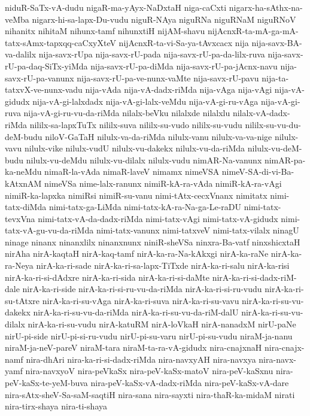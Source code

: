 {niduR-SaTx-vA-dudu
nigaR-ma-yAyx-NaDxtaH
niga-caCxti
nigarx-ha-sAthx-na-veMba
nigarx-hi-sa-lapx-Du-vudu
niguR-NAya
niguRNa
niguRNaM
niguRNoV
nihanitx
nihitaM
nihunx-tamf
nihunxtiH
nijAM-shavu
nijAcnxR-ta-mA-ga-mA-tatx-sAmx-tapxqq-caCxyXteV
nijAcnxR-ta-vi-Sa-ya-tAvxcacx
nija
nija-savx-BA-va-dalilx
nija-savx-rUpa
nija-savx-rU-pada
nija-savx-rU-pa-da-lilx-ruva
nija-savx-rU-pa-daq-SiTx-yiMda
nija-savx-rU-pa-diMda
nija-savx-rU-pa-jAcnx-navu
nija-savx-rU-pa-vanunx
nija-savx-rU-pa-ve-nunx-vaMte
nija-savx-rU-pavu
nija-ta-tatxvX-ve-nunx-vadu
nija-vAda
nija-vA-dadx-riMda
nija-vAga
nija-vAgi
nija-vA-gidudx
nija-vA-gi-lalxdadx
nija-vA-gi-lalx-veMdu
nija-vA-gi-ru-vAga
nija-vA-gi-ruva
nija-vA-gi-ru-vu-da-riMda
nilalx-beVku
nilalxde
nilalxlu
nilalx-vA-dadx-riMda
nililx-sa-lapxTuTx
nililx-suva
nililx-su-vudo
nililx-su-vudu
nililx-su-vu-du-deM-budu
niloV-GaTaH
nilulx-va-da-riMda
nilulx-vanu
nilulx-va-va-nige
nilulx-vavu
nilulx-vike
nilulx-vudU
nilulx-vu-dakekx
nilulx-vu-da-riMda
nilulx-vu-deM-budu
nilulx-vu-deMdu
nilulx-vu-dilalx
nilulx-vudu
nimAR-Na-vanunx
nimAR-pa-ka-neMdu
nimaR-la-vAda
nimaR-laveV
nimamx
nimeVSA
nimeV-SA-di-vi-Ba-kAtxnAM
nimeVSa
nime-lalx-ranunx
nimiR-kA-ra-vAda
nimiR-kA-ra-vAgi
nimiR-ka-lapxka
nimiRsi
nimiR-su-vanu
nimi-tAtx-cecxVnanx
nimitatx
nimi-tatx-diMda
nimi-tatx-ga-LiMda
nimi-tatx-kA-ra-Na-ga-Le-raDU
nimi-tatx-tevxVna
nimi-tatx-vA-da-dadx-riMda
nimi-tatx-vAgi
nimi-tatx-vA-gidudx
nimi-tatx-vA-gu-vu-da-riMda
nimi-tatx-vanunx
nimi-tatxveV
nimi-tatx-vilalx
ninagU
ninage
ninanx
ninanxlilx
ninanxnunx
niniR-sheVSa
ninxra-Ba-vatf
ninxshicxtaH
nirAha
nirA-kaqtaH
nirA-kaq-tamf
nirA-ka-ra-Na-kAkxgi
nirA-ka-raNe
nirA-ka-ra-Neya
nirA-ka-ri-sade
nirA-ka-ri-sa-lapx-TiTxde
nirA-ka-ri-salu
nirA-ka-risi
nirA-ka-ri-si-dAdxre
nirA-ka-ri-sida
nirA-ka-ri-si-daMte
nirA-ka-ri-si-dadx-riM-dale
nirA-ka-ri-side
nirA-ka-ri-si-ru-vu-da-riMda
nirA-ka-ri-si-ru-vudu
nirA-ka-ri-su-tAtxre
nirA-ka-ri-su-vAga
nirA-ka-ri-suva
nirA-ka-ri-su-vavu
nirA-ka-ri-su-vu-dakekx
nirA-ka-ri-su-vu-da-riMda
nirA-ka-ri-su-vu-da-riM-dalU
nirA-ka-ri-su-vu-dilalx
nirA-ka-ri-su-vudu
nirA-katuRM
nirA-loVkaH
nirA-nanadxM
nirU-paNe
nirU-pi-side
nirU-pi-si-ru-vudu
nirU-pi-su-varu
nirU-pi-su-vudu
niraM-ja-nanu
niraM-ja-neV-pareV
niraM-tara
niraM-ta-ra-vA-gidudx
nira-cnajxnaH
nira-cnajx-namf
nira-dhAri
nira-ka-ri-si-dadx-riMda
nira-navxyAH
nira-navxya
nira-navx-yamf
nira-navxyoV
nira-peVkaSx
nira-peV-kaSx-matoV
nira-peV-kaSxnu
nira-peV-kaSx-te-yeM-buva
nira-peV-kaSx-vA-dadx-riMda
nira-peV-kaSx-vA-dare
nira-sAtx-sheV-Sa-saM-saqtiH
nira-sana
nira-sayxti
nira-thaR-ka-midaM
nirati
nira-tirx-shaya
nira-ti-shaya
}
